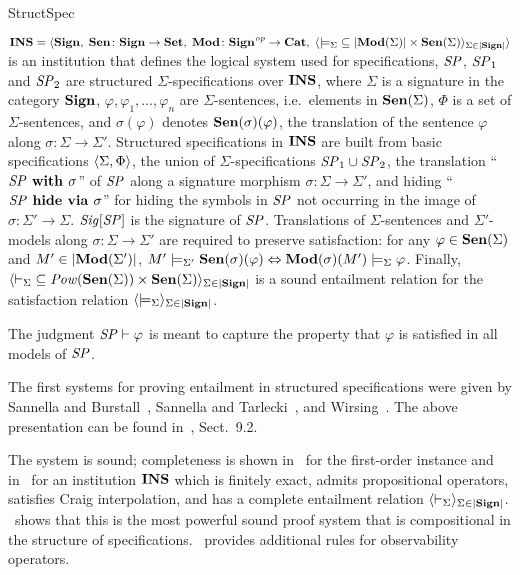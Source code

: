 \begin{entry}{StructSpec}
\begin{clarifications}
  ${\bf INS} = \langle{{\bf Sign},\; {\bf Sen}\colon{\bf Sign}\to{\bf Set},\; {\bf Mod}\colon{\bf Sign}^{\mathit{op}}\to{\bf Cat},\;
          \langle{{\models_\Sigma}\subseteq|{\bf Mod}(\Sigma)|\times{\bf Sen}(\Sigma)}\rangle_{\Sigma\in|{\bf Sign}|}}\rangle$
  is an institution that defines the logical system used for specifications,
  $\mathit{SP}$, $\mathit{SP}_1$ and $\mathit{SP}_2$ are structured $\Sigma$-specifications over ${\bf INS}$,
  where $\Sigma$ is a signature in the category ${\bf Sign}$, $\varphi, \varphi_1,
  \ldots, \varphi_n$ are $\Sigma$-sentences, i.e.\ elements in ${\bf Sen}(\Sigma)$,
  $\Phi$ is a set of $\Sigma$-sentences, and $\sigma(\varphi)$ denotes
  ${\bf Sen}(\sigma)(\varphi)$, the translation of the sentence $\varphi$ along
  $\sigma\colon\Sigma\to\Sigma'$. 
  Structured specifications in ${\bf INS}$ are built from basic specifications
  $\langle{\Sigma, \Phi}\rangle$, the union of $\Sigma$-specifications
  $\mathit{SP}_1 \cup \mathit{SP}_2$, the translation ``$\mathit{SP}\textbf{\upshape{} with }\sigma$'' of $\mathit{SP}$
  along a signature morphism $\sigma\colon\Sigma\to\Sigma'$, and hiding
  ``$\mathit{SP}\textbf{\upshape{} hide via }\sigma$'' for hiding the symbols in $\mathit{SP}$ not occurring in the
  image of $\sigma\colon\Sigma'\to\Sigma$.  $\mathit{Sig}[\mathit{SP}]$ is the signature of
  $\mathit{SP}$.
  Translations of $\Sigma$-sentences and $\Sigma'$-models along 
  $\sigma \colon \Sigma \rightarrow \Sigma'$ 
  are required to preserve satisfaction: for any
  $\varphi \in {\bf Sen}(\Sigma)$ and 
  $M' \in |{\bf Mod}(\Sigma')|$, 
  $M' \models_{\Sigma'} {\bf Sen}(\sigma)(\varphi) 
      \Leftrightarrow {\bf Mod}(\sigma)(M') \models_{\Sigma} \varphi$. 
  Finally,
  $\langle{{\vdash_\Sigma}\subseteq{\mathit{Pow}}({\bf Sen}(\Sigma))\times{\bf Sen}(\Sigma)}\rangle_{\Sigma\in|{\bf Sign}|}$
  is a sound entailment relation for the satisfaction relation
  $\langle{{\models_\Sigma}}\rangle_{\Sigma\in|{\bf Sign}|}$.
  
  The judgment $\mathit{SP} \vdash \varphi$ is meant to capture the property that
  $\varphi$ is satisfied in all models of $\mathit{SP}$.
\end{clarifications}

\begin{history}
  The first systems for proving entailment in structured specifications were
  given by Sannella and Burstall~\cite{SB83}, Sannella and Tarlecki~\cite{ST88},
  and Wirsing~\cite{Wir91}.
  The above presentation can be found in~\cite{ST12}, Sect.~9.2.
\end{history}

\begin{technicalities}
  The system is sound; completeness is shown in~\cite{Wir91} for the first-order
  instance and in~\cite{Bor02,ST12} for an institution ${\bf INS}$ which is
  finitely exact, admits propositional operators, satisfies Craig interpolation,
  and has a complete entailment relation
  $\langle{{\vdash_\Sigma}}\rangle_{\Sigma\in|{\bf Sign}|}$. \cite{ST14}~shows that this is the
  most powerful sound proof system that is compositional in the structure of
  specifications. \cite{RH97}~provides additional rules for observability
  operators.
\end{technicalities}

\end{entry}
